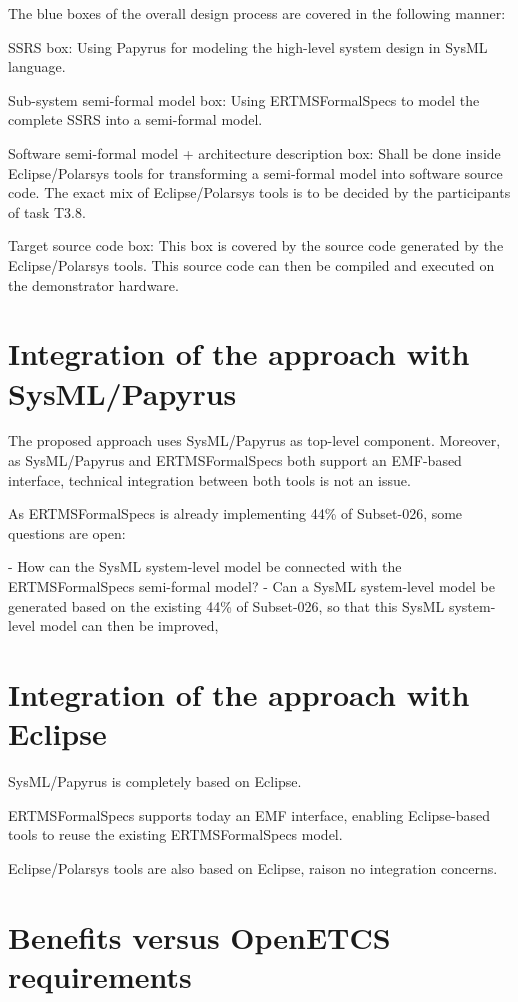 The blue boxes of the overall design process are covered in the following manner:

SSRS box: Using Papyrus for modeling the high-level system design in SysML language. 

Sub-system semi-formal model box: Using ERTMSFormalSpecs to model the complete SSRS into a semi-formal model.

Software semi-formal model + architecture description box: Shall be done inside Eclipse/Polarsys tools for transforming a semi-formal model 
into software source code. The exact mix of Eclipse/Polarsys tools is to be decided by the participants of task T3.8. 

Target source code box: This box is covered by the source code generated by the Eclipse/Polarsys tools. This source code can then be compiled and executed on the demonstrator hardware. 

\section{Integration of the approach with SysML/Papyrus}

The proposed approach uses SysML/Papyrus as top-level component. Moreover, as SysML/Papyrus and ERTMSFormalSpecs both support an EMF-based interface, 
technical integration between both tools is not an issue.

As ERTMSFormalSpecs is already implementing 44\% of Subset-026, some questions are open:

- How can the SysML system-level model be connected with the ERTMSFormalSpecs semi-formal model? 
- Can a SysML system-level model be generated based on the existing 44\% of Subset-026, so that this SysML system-level model 
can then be improved, 

\section{Integration of the approach with Eclipse}

SysML/Papyrus is completely based on Eclipse.

ERTMSFormalSpecs supports today an EMF interface, enabling Eclipse-based tools to reuse the existing ERTMSFormalSpecs model. 

Eclipse/Polarsys tools are also based on Eclipse, raison no integration concerns.

\section{Benefits versus OpenETCS requirements}

